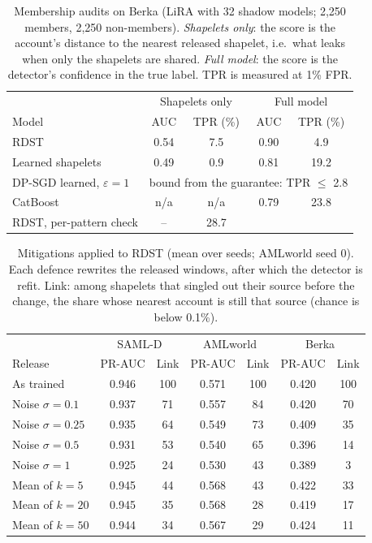 \begin{table}[t]
\caption{Membership audits on Berka (LiRA with 32 shadow models; 2,250 members, 2,250 non-members). \emph{Shapelets only}: the score is the account's distance to the nearest released shapelet, i.e.\ what leaks when only the shapelets are shared. \emph{Full model}: the score is the detector's confidence in the true label. TPR is measured at 1\% FPR.}
\label{tab:lira}
\small\setlength{\tabcolsep}{3pt}
\centering
\begin{tabular}{lcccc}
\toprule
& \multicolumn{2}{c}{Shapelets only} & \multicolumn{2}{c}{Full model} \\
Model & AUC & TPR (\%) & AUC & TPR (\%) \\
\midrule
RDST & 0.54 & 7.5 & 0.90 & 4.9 \\
Learned shapelets & 0.49 & 0.9 & 0.81 & 19.2 \\
DP-SGD learned, $\varepsilon{=}1$ & \multicolumn{4}{c}{bound from the guarantee: TPR $\leq$ 2.8} \\
CatBoost & n/a & n/a & 0.79 & 23.8 \\
\midrule
RDST, per-pattern check & -- & 28.7 & & \\
\bottomrule\end{tabular}\end{table}
\begin{table}[t]
\caption{Mitigations applied to RDST (mean over seeds; AMLworld seed 0). Each defence rewrites the released windows, after which the detector is refit. Link: among shapelets that singled out their source before the change, the share whose nearest account is still that source (chance is below 0.1\%).}
\label{tab:rdstdef}
\small\setlength{\tabcolsep}{2.5pt}
\centering
\begin{tabular}{lcccccc}
\toprule
& \multicolumn{2}{c}{SAML-D} & \multicolumn{2}{c}{AMLworld} & \multicolumn{2}{c}{Berka} \\
Release & PR-AUC & Link & PR-AUC & Link & PR-AUC & Link \\
\midrule
As trained & 0.946 & 100 & 0.571 & 100 & 0.420 & 100 \\
Noise $\sigma{=}0.1$ & 0.937 & 71 & 0.557 & 84 & 0.420 & 70 \\
Noise $\sigma{=}0.25$ & 0.935 & 64 & 0.549 & 73 & 0.409 & 35 \\
Noise $\sigma{=}0.5$ & 0.931 & 53 & 0.540 & 65 & 0.396 & 14 \\
Noise $\sigma{=}1$ & 0.925 & 24 & 0.530 & 43 & 0.389 & 3 \\
Mean of $k{=}5$ & 0.945 & 44 & 0.568 & 43 & 0.422 & 33 \\
Mean of $k{=}20$ & 0.945 & 35 & 0.568 & 28 & 0.419 & 17 \\
Mean of $k{=}50$ & 0.944 & 34 & 0.567 & 29 & 0.424 & 11 \\
\bottomrule\end{tabular}\end{table}
